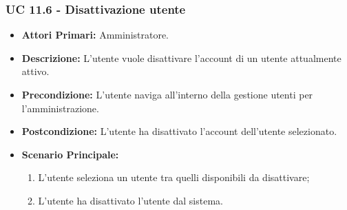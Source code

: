 			
			\subsubsection{UC 11.6 - Disattivazione utente}
			\begin{itemize}
				\item \textbf{Attori Primari:} Amministratore.
				\item \textbf{Descrizione:} L'utente vuole disattivare l'account di un utente attualmente attivo.
				\item \textbf{Precondizione:} L'utente naviga all'interno della gestione utenti per l'amministrazione.
				\item \textbf{Postcondizione:} L'utente ha disattivato l'account dell'utente selezionato.
				\item \textbf{Scenario Principale:}
				\begin{enumerate}
					\item{L'utente seleziona un utente tra quelli disponibili da disattivare;}
					\item{L'utente ha disattivato l'utente dal sistema.}
				\end{enumerate}		
			\end{itemize}

			
			